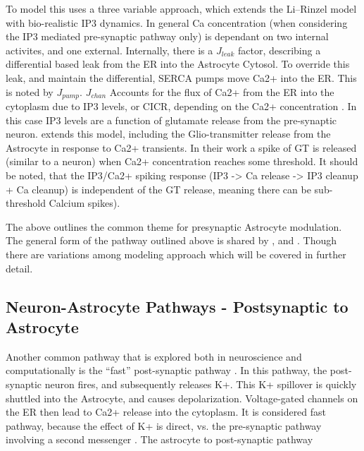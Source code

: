     To model this \cite{pitta_2009} uses a three variable approach, which
    extends the Li–Rinzel model with bio-realistic IP3 dynamics. In general Ca
    concentration (when considering the IP3 mediated pre-synaptic pathway only)
    is dependant on two internal activites, and one external. Internally, there
    is a $J_{leak}$ factor, describing a differential based leak from the ER
    into the Astrocyte Cytosol. To override this leak, and maintain the
    differential, SERCA pumps move Ca2+ into the ER. This is noted by
    $J_{pump}$. $J_{chan}$ Accounts for the flux of Ca2+ from the ER into the
    cytoplasm due to IP3 levels, or CICR, depending on the Ca2+ concentration
    \cite{pitta_2009}. In this case IP3 levels are a function of glutamate
    release from the pre-synaptic neuron.  \cite{pitta_2016} extends this model,
    including the Glio-transmitter release from the Astrocyte in response to
    Ca2+ transients. In their work a spike of GT is released (similar to a
    neuron) when Ca2+ concentration reaches some threshold. It should be noted,
    that the IP3/Ca2+ spiking response (IP3 -> Ca release -> IP3 cleanup + Ca
    cleanup) is independent of the GT release, meaning there can be
    sub-threshold Calcium spikes).

    The above outlines the common theme for presynaptic Astrocyte
    modulation. The general form of the pathway outlined above is shared by
    \cite{postnov_2009}, and \cite{wade_2011}. Though there are variations among
    modeling approach which will be covered in further detail.

    
    \subsection{Neuron-Astrocyte Pathways - Postsynaptic to Astrocyte}
    Another common pathway that is explored both in neuroscience and
    computationally is the ``fast'' post-synaptic pathway \cite{bassam_2015}. In
    this pathway, the post-synaptic neuron fires, and subsequently releases
    K+. This K+ spillover is quickly shuttled into the Astrocyte, and causes
    depolarization. Voltage-gated channels on the ER then lead to Ca2+ release
    into the cytoplasm. It is considered fast pathway, because the effect of K+
    is direct, vs. the pre-synaptic pathway involving a second messenger
    \cite{bassam_2015}. The astrocyte to post-synaptic pathway

    
